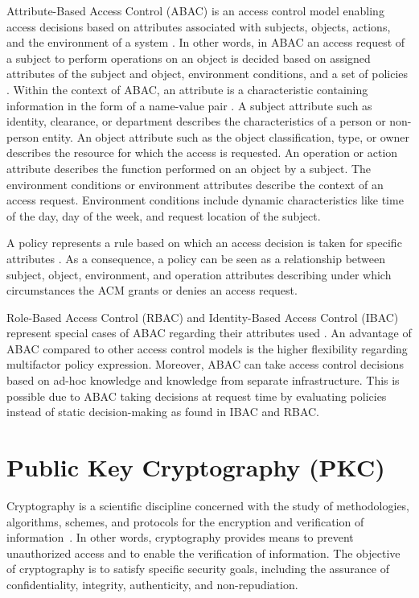 Attribute-Based Access Control (ABAC) is an access control model enabling access decisions based on attributes associated with subjects, objects, actions, and the environment of a system \cite{JTF2020}.
In other words, in ABAC an access request of a subject to perform operations on an object is decided based on assigned attributes of the subject and object, environment conditions, and a set of policies \cite{Hu2014}.
Within the context of ABAC, an attribute is a characteristic containing information in the form of a name-value pair \cite{Hu2014}.
A subject attribute such as identity, clearance, or department describes the characteristics of a person or non-person entity.
An object attribute such as the object classification, type, or owner describes the resource for which the access is requested.
An operation or action attribute describes the function performed on an object by a subject.
The environment conditions or environment attributes describe the context of an access request.
Environment conditions include dynamic characteristics like time of the day, day of the week, and request location of the subject.

A policy represents a rule based on which an access decision is taken for specific attributes \cite{Hu2014}.
As a consequence, a policy can be seen as a relationship between subject, object, environment, and operation attributes describing under which circumstances the ACM grants or denies an access request.

Role-Based Access Control (RBAC) and Identity-Based Access Control (IBAC) represent special cases of ABAC regarding their attributes used \cite{Hu2014}.
An advantage of ABAC compared to other access control models is the higher flexibility regarding multifactor policy expression.
Moreover, ABAC can take access control decisions based on ad-hoc knowledge and knowledge from separate infrastructure.
This is possible due to ABAC taking decisions at request time by evaluating policies instead of static decision-making as found in IBAC and RBAC.

\section{Public Key Cryptography (PKC)}
\label{sec:fundamentals:cryptography}
Cryptography is a scientific discipline concerned with the study of methodologies, algorithms, schemes, and protocols for the encryption and verification of information~\cite{Barker2016,Barker2020,CNSS2022}.
In other words, cryptography provides means to prevent unauthorized access and to enable the verification of information.
The objective of cryptography is to satisfy specific security goals, including the assurance of confidentiality, integrity, authenticity, and non-repudiation.

